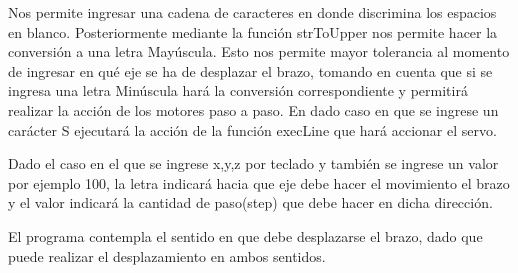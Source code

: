 Nos permite ingresar una cadena de caracteres en donde discrimina los espacios en blanco. Posteriormente mediante la función strToUpper nos permite hacer la conversión a una letra Mayúscula. Esto nos permite mayor tolerancia al momento de ingresar en qué eje se ha de desplazar el brazo, tomando en cuenta que si se ingresa una letra Minúscula hará la conversión correspondiente y permitirá realizar la acción de los motores paso a paso. En dado caso en que se ingrese un carácter S ejecutará la acción de la función execLine que hará accionar el servo.
\par
Dado el caso en el que se ingrese x,y,z por teclado y también se ingrese un valor por ejemplo 100, la letra indicará hacia que eje debe hacer el movimiento el brazo y el valor indicará la cantidad de paso(step) que debe hacer en dicha dirección.
\par
El programa contempla el sentido en que debe desplazarse el brazo, dado que puede realizar el desplazamiento en ambos sentidos.
